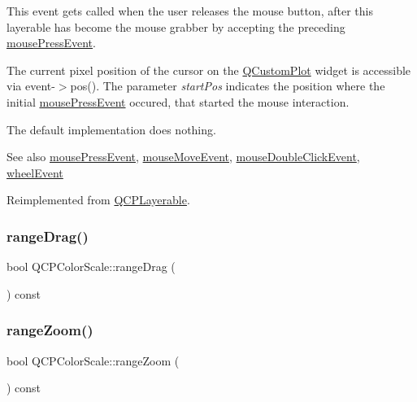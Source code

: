 This event gets called when the user releases the mouse button, after this layerable has become the mouse grabber by accepting the preceding \mbox{\hyperlink{class_q_c_p_color_scale_a91f633b97ffcd57fdf8cd814974c20e6}{mouse\+Press\+Event}}.

The current pixel position of the cursor on the \mbox{\hyperlink{class_q_custom_plot}{Q\+Custom\+Plot}} widget is accessible via {\ttfamily event-\/$>$pos()}. The parameter {\itshape start\+Pos} indicates the position where the initial \mbox{\hyperlink{class_q_c_p_color_scale_a91f633b97ffcd57fdf8cd814974c20e6}{mouse\+Press\+Event}} occured, that started the mouse interaction.

The default implementation does nothing.

\begin{DoxySeeAlso}{See also}
\mbox{\hyperlink{class_q_c_p_color_scale_a91f633b97ffcd57fdf8cd814974c20e6}{mouse\+Press\+Event}}, \mbox{\hyperlink{class_q_c_p_color_scale_a3b2bd79725aefaf2630fc76e90939442}{mouse\+Move\+Event}}, \mbox{\hyperlink{class_q_c_p_layerable_a4171e2e823aca242dd0279f00ed2de81}{mouse\+Double\+Click\+Event}}, \mbox{\hyperlink{class_q_c_p_color_scale_a63cf19be184f6670c9495ad3a9a1baeb}{wheel\+Event}} 
\end{DoxySeeAlso}


Reimplemented from \mbox{\hyperlink{class_q_c_p_layerable_aa0d79b005686f668622bbe66ac03ba2c}{Q\+C\+P\+Layerable}}.

\mbox{\label{class_q_c_p_color_scale_a2a0670492f2a780596ea455ea8496a78}} 
\subsubsection{\texorpdfstring{rangeDrag()}{rangeDrag()}}
{\footnotesize\ttfamily bool Q\+C\+P\+Color\+Scale\+::range\+Drag (\begin{DoxyParamCaption}{ }\end{DoxyParamCaption}) const}

\mbox{\label{class_q_c_p_color_scale_adb4c3ada2b1e5ebbdead3b097064ff0b}} 
\subsubsection{\texorpdfstring{rangeZoom()}{rangeZoom()}}
{\footnotesize\ttfamily bool Q\+C\+P\+Color\+Scale\+::range\+Zoom (\begin{DoxyParamCaption}{ }\end{DoxyParamCaption}) const}

